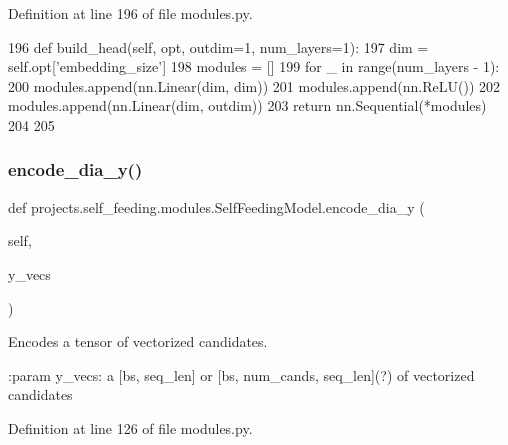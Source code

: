 Definition at line 196 of file modules.\+py.


\begin{DoxyCode}
196     \textcolor{keyword}{def }build\_head(self, opt, outdim=1, num\_layers=1):
197         dim = self.opt[\textcolor{stringliteral}{'embedding\_size'}]
198         modules = []
199         \textcolor{keywordflow}{for} \_ \textcolor{keywordflow}{in} range(num\_layers - 1):
200             modules.append(nn.Linear(dim, dim))
201             modules.append(nn.ReLU())
202         modules.append(nn.Linear(dim, outdim))
203         \textcolor{keywordflow}{return} nn.Sequential(*modules)
204 
205 
\end{DoxyCode}
\mbox{\label{classprojects_1_1self__feeding_1_1modules_1_1SelfFeedingModel_aac70a3595157ac4a601774d3d1bac35b}} 
\subsubsection{\texorpdfstring{encode\+\_\+dia\+\_\+y()}{encode\_dia\_y()}}
{\footnotesize\ttfamily def projects.\+self\+\_\+feeding.\+modules.\+Self\+Feeding\+Model.\+encode\+\_\+dia\+\_\+y (\begin{DoxyParamCaption}\item[{}]{self,  }\item[{}]{y\+\_\+vecs }\end{DoxyParamCaption})}

\begin{DoxyVerb}Encodes a tensor of vectorized candidates.

:param y_vecs: a [bs, seq_len] or [bs, num_cands, seq_len](?) of vectorized
    candidates
\end{DoxyVerb}
 

Definition at line 126 of file modules.\+py.



